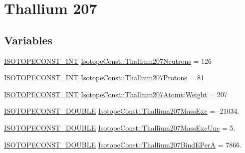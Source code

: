 \hypertarget{group___isotope_const-_thallium-_tl207}{}\section{Thallium 207}
\label{group___isotope_const-_thallium-_tl207}
\subsection*{Variables}
\begin{DoxyCompactItemize}
\item 
\mbox{\hyperlink{group___isotope_const-_macros_ga5f18360b3e99483a35c32d789e62621c}{I\+S\+O\+T\+O\+P\+E\+C\+O\+N\+S\+T\+\_\+\+I\+NT}} \mbox{\hyperlink{group___isotope_const-_thallium-_tl207_ga0fe96f9a0b9315059a990bb37210842a}{Isotope\+Const\+::\+Thallium207\+Neutrons}} = 126
\item 
\mbox{\hyperlink{group___isotope_const-_macros_ga5f18360b3e99483a35c32d789e62621c}{I\+S\+O\+T\+O\+P\+E\+C\+O\+N\+S\+T\+\_\+\+I\+NT}} \mbox{\hyperlink{group___isotope_const-_thallium-_tl207_ga0cc6d7b197d84008d35ebb313cf8956d}{Isotope\+Const\+::\+Thallium207\+Protons}} = 81
\item 
\mbox{\hyperlink{group___isotope_const-_macros_ga5f18360b3e99483a35c32d789e62621c}{I\+S\+O\+T\+O\+P\+E\+C\+O\+N\+S\+T\+\_\+\+I\+NT}} \mbox{\hyperlink{group___isotope_const-_thallium-_tl207_ga1ec60d5bb70ff241e5dbcb8d467f38f9}{Isotope\+Const\+::\+Thallium207\+Atomic\+Weight}} = 207
\item 
\mbox{\hyperlink{group___isotope_const-_macros_ga8f45a7272ce02c0b4c65c44636ed719a}{I\+S\+O\+T\+O\+P\+E\+C\+O\+N\+S\+T\+\_\+\+D\+O\+U\+B\+LE}} \mbox{\hyperlink{group___isotope_const-_thallium-_tl207_ga9bc218f2255989ac2ca56a47ade6bfdc}{Isotope\+Const\+::\+Thallium207\+Mass\+Exc}} = -\/21034.
\item 
\mbox{\hyperlink{group___isotope_const-_macros_ga8f45a7272ce02c0b4c65c44636ed719a}{I\+S\+O\+T\+O\+P\+E\+C\+O\+N\+S\+T\+\_\+\+D\+O\+U\+B\+LE}} \mbox{\hyperlink{group___isotope_const-_thallium-_tl207_ga493d6155968b69dec381c689f1c11a1d}{Isotope\+Const\+::\+Thallium207\+Mass\+Exc\+Unc}} = 5.
\item 
\mbox{\hyperlink{group___isotope_const-_macros_ga8f45a7272ce02c0b4c65c44636ed719a}{I\+S\+O\+T\+O\+P\+E\+C\+O\+N\+S\+T\+\_\+\+D\+O\+U\+B\+LE}} \mbox{\hyperlink{group___isotope_const-_thallium-_tl207_gad49fe215728ec54c91809306cac23a86}{Isotope\+Const\+::\+Thallium207\+Bind\+E\+PerA}} = 7866.
\item 

\end{DoxyCompactItemize}
